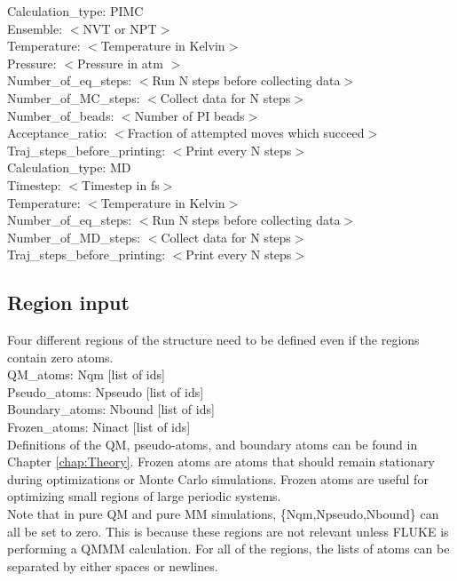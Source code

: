 \documentclass[12pt]{report}
\begin{document}
Calculation\_type: PIMC \\
Ensemble: $<$NVT or NPT$>$ \\
Temperature: $<$Temperature in Kelvin$>$ \\
Pressure: $<$Pressure in atm $>$ \\
Number\_of\_eq\_steps: $<$Run N steps before collecting data$>$ \\
Number\_of\_MC\_steps: $<$Collect data for N steps$>$ \\
Number\_of\_beads: $<$Number of PI beads$>$ \\
Acceptance\_ratio: $<$Fraction of attempted moves which succeed$>$ \\
Traj\_steps\_before\_printing: $<$Print every N steps$>$ \\

Calculation\_type: MD \\
Timestep: $<$Timestep in fs$>$ \\
Temperature: $<$Temperature in Kelvin$>$ \\
Number\_of\_eq\_steps: $<$Run N steps before collecting data$>$ \\
Number\_of\_MD\_steps: $<$Collect data for N steps$>$ \\
Traj\_steps\_before\_printing: $<$Print every N steps$>$ \\

\subsection{Region input}

Four different regions of the structure need to be defined even if the
regions contain zero atoms. \\

QM\_atoms: Nqm [list of ids] \\
Pseudo\_atoms: Npseudo [list of ids] \\
Boundary\_atoms: Nbound [list of ids] \\
Frozen\_atoms: Ninact [list of ids] \\

Definitions of the QM, pseudo-atoms, and boundary atoms can be found in
Chapter \ref{chap:Theory}. Frozen atoms are atoms that should remain
stationary during optimizations or Monte Carlo simulations. Frozen atoms are
useful for optimizing small regions of large periodic systems. \\

Note that in pure QM and pure MM simulations, \{Nqm,Npseudo,Nbound\} can all
be set to zero. This is because these regions are not relevant unless FLUKE is
performing a QMMM calculation. For all of the regions, the lists of atoms can
be separated by either spaces or newlines.
\end{document}
